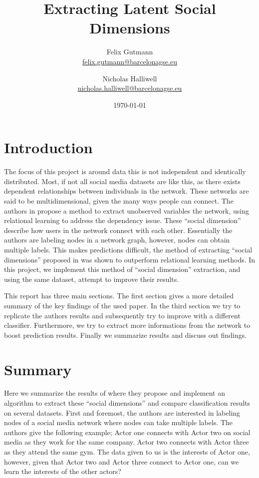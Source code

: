 \documentclass[11pt,letterpaper]{article}
\author{
	Felix Gutmann\\
	\href{mailto:felix.gutmann@barcelonagse.eu}{felix.gutmann@barcelonagse.eu}
	\and
	Nicholas Halliwell\\
	\href{mailto:nicholas.halliwell@barcelonagse.eu}{nicholas.halliwell@barcelonagse.eu}}
\title{Extracting Latent Social Dimensions}
\date{\today}
\begin{document}
\maketitle

\section*{Introduction} 

The focus of this project is around data this is not independent and identically distributed. Most, if not all social media datasets are like this, as there exists dependent relationships between individuals in the network. These networks are said to be multidimensional, given the many ways people can connect. The authors in \cite{latent} propose a method to extract unobserved variables the network, using relational learning to address the dependency issue. These ``social dimension'' describe how users in the network connect with each other. Essentially the authors are labeling nodes in a network graph, however, nodes can obtain multiple labels. This makes predictions difficult, the method of extracting ``social dimensions'' proposed in \cite{latent} was shown to outperform relational learning methods. In this project, we implement this method of ``social dimension'' extraction, and using the same dataset, attempt to improve their results.

This report has three main sections. The first section gives a more detailed summary of the key findings of the used paper. In the third section we try to replicate the authors results and subsequently try to improve with a different classifier. Furthermore, we try to extract more informations from the network to boost prediction results.
Finally we summarize results and discuss out findings.

\section*{Summary}
Here we summarize the results of \cite{latent} where they propose and implement an algorithm to extract these ``social dimensions'' and compare classification results on several datasets. First and foremost, the authors are interested in labeling nodes of a social media network where nodes can take multiple labels. The authors give the following example; Actor one connects with Actor two on social media as they work for the same company. Actor two connects with Actor three as they attend the same gym. The data given to us is the interests of Actor one, however, given that Actor two and Actor three connect to Actor one, can we learn the interests of the other actors?\par
\end{document}
